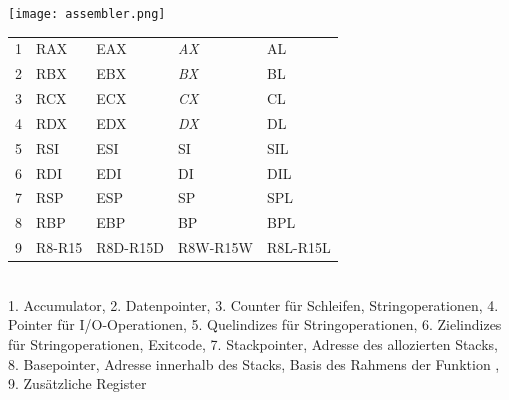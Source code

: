 \documentclass[10pt,landscape,a4paper]{article}
\begin{document}
\begin{multicols*}{4}
\texttt{[image: assembler.png]}\\
\begin{tabular}{lllll}
1 & RAX     & \textcolor{reg1}{EAX}     & \textcolor{reg2}{\textit{AX}} & \textcolor{reg3}{AL}\\
2 & RBX     & \textcolor{reg1}{EBX}     & \textcolor{reg2}{\textit{BX}} & \textcolor{reg3}{BL}\\
3 & RCX     & \textcolor{reg1}{ECX}     & \textcolor{reg2}{\textit{CX}} & \textcolor{reg3}{CL}\\
4 & RDX     & \textcolor{reg1}{EDX}     & \textcolor{reg2}{\textit{DX}} & \textcolor{reg3}{DL}\\
5 & RSI     & \textcolor{reg1}{ESI}     & \textcolor{reg2}{SI} & \textcolor{reg3}{SIL}\\
6 & RDI     &  \textcolor{reg1}{EDI}    & \textcolor{reg2}{DI} & \textcolor{reg3}{DIL}\\
7 & RSP     & \textcolor{reg1}{ESP}     & \textcolor{reg2}{SP} & \textcolor{reg3}{SPL}\\
8 & RBP     & \textcolor{reg1}{EBP}     & \textcolor{reg2}{BP} &  \textcolor{reg3}{BPL}\\
9 & R8-R15  & \textcolor{reg1}{R8D-R15D} & \textcolor{reg2}{R8W-R15W} & \textcolor{reg3}{R8L-R15L}
\end{tabular}\\
1. Accumulator, 2. Datenpointer, 3. Counter für Schleifen, Stringoperationen, 4. Pointer für I/O-Operationen,
5. Quelindizes für Stringoperationen, 6. Zielindizes für Stringoperationen, Exitcode, 7. Stackpointer, Adresse des allozierten Stacks,
8. Basepointer, Adresse innerhalb des Stacks, Basis des Rahmens der Funktion , 9. Zusätzliche Register

\end{multicols*}
\end{document}
